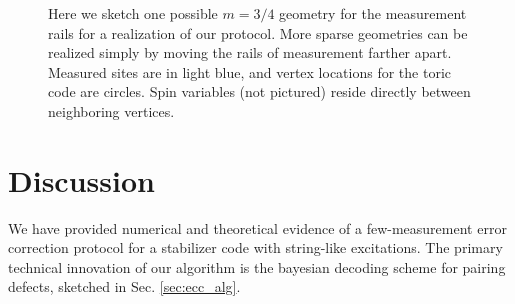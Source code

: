 \documentclass[twocolumn,superscriptaddress,aps,prb,floatfix]{revtex4-1}
\begin{document}
\begin{figure}
\begin{center}
\end{center}
\caption{Here we sketch one possible $m=3/4$ geometry for the measurement rails for a realization of our protocol.  More sparse geometries can be realized simply by moving the rails of measurement farther apart.  Measured sites are in light blue, and vertex locations for the toric code are circles.  Spin variables (not pictured) reside directly between neighboring vertices.}
\label{fig:tc_fig}
\end{figure}




\section{Discussion}
\label{sec:discussion}

We have provided numerical and theoretical evidence of a few-measurement error correction protocol for a stabilizer code with string-like excitations.  The primary technical innovation of our algorithm is the bayesian decoding scheme for pairing defects, sketched in Sec. \ref{sec:ecc_alg}.




\end{document}
